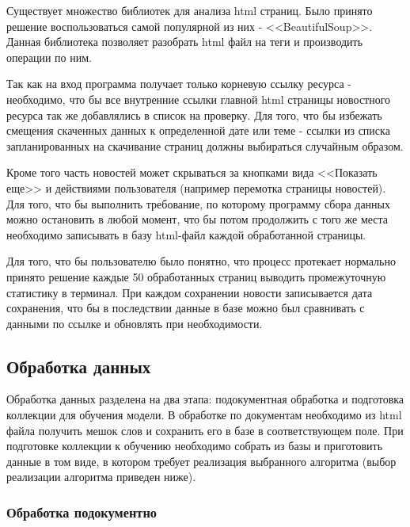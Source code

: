 Существует множество библиотек для анализа html страниц. Было принято решение воспользоваться самой популярной из них - <<BeautifulSoup>>. Данная библиотека позволяет разобрать html файл на теги и производить операции по ним.

Так как на вход программа получает только корневую ссылку ресурса - необходимо, что бы все внутренние ссылки главной html страницы новостного ресурса так же добавлялись в список на проверку. Для того, что бы избежать смещения скаченных данных к определенной дате или теме - ссылки из списка запланированных на скачивание страниц должны выбираться случайным образом.

Кроме того часть новостей может скрываться за кнопками вида <<Показать еще>> и действиями пользователя (например перемотка страницы новостей). Для того, что бы выполнить требование, по которому программу сбора данных можно остановить в любой момент, что бы потом продолжить с того же места необходимо записывать в базу html-файл каждой обработанной страницы.

Для того, что бы пользователю было понятно, что процесс протекает нормально принято решение каждые 50 обработанных страниц выводить промежуточную статистику в терминал. При каждом сохранении новости записывается дата сохранения, что бы в последствии данные в базе можно был сравнивать с данными по ссылке и обновлять при необходимости.

\subsection{Обработка данных}

Обработка данных разделена на два этапа: подокументная обработка и подготовка коллекции для обучения модели. В обработке по документам необходимо из html файла получить мешок слов и сохранить его в базе в соответствующем поле. При подготовке коллекции к обучению необходимо собрать из базы и приготовить данные в том виде, в котором требует реализация выбранного алгоритма (выбор реализации алгоритма приведен ниже).

\subsubsection{Обработка подокументно}

